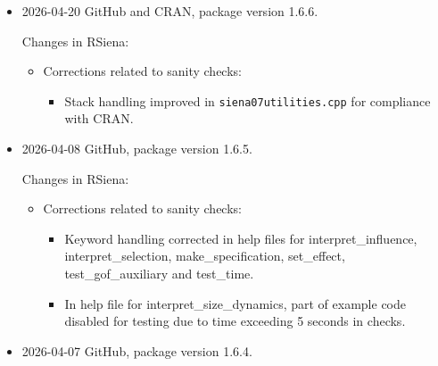\documentclass[a4paper,fleqn,11pt]{article}
\newcommand{\+}{\, + \,}
\newcommand{\sfn}[1]{\textsf{#1}}
\begin{document}
\begin{small}
\begin{itemize}
Changes in RSiena:
\begin{itemize}
\item Improvements of functionality:
   \begin{itemize}
     \item Option \texttt{onestep}  for \sfn{test\_parameter(..., method="score", ...)} .
     \item Option \texttt{onestep}  for \sfn{update\_theta}.
  \item Name \texttt{sienaNet}  added to \sfn{transformScript}  as one of the names
    to be replaced.
  \item \sfn{make\_effects}  now also works for \texttt{sienadata}
  objects older than 1.4.10.
   \end{itemize}
\end{itemize}

\item 2026-04-20 GitHub and CRAN, package version 1.6.6.

Changes in RSiena:
\begin{itemize}
\item Corrections related to sanity checks:
   \begin{itemize}
     \item Stack handling improved in
       \texttt{siena07utilities.cpp} for compliance with CRAN.
   \end{itemize}
\end{itemize}


\item 2026-04-08 GitHub, package version 1.6.5.

Changes in RSiena:
\begin{itemize}
\item Corrections related to sanity checks:
   \begin{itemize}
     \item  Keyword handling corrected in help files for
       \sfn{interpret\_influence}, \sfn{interpret\_selection},
       \sfn{make\_specification}, \sfn{set\_effect},
       \sfn{test\_gof\_auxiliary} and \sfn{test\_time}.
     \item In help file for \sfn{interpret\_size\_dynamics}, part of
       example code disabled for testing due to time exceeding 5
       seconds in checks.
   \end{itemize}
\end{itemize}


\item 2026-04-07 GitHub, package version 1.6.4.


\end{itemize}
\end{small}
\end{document}
